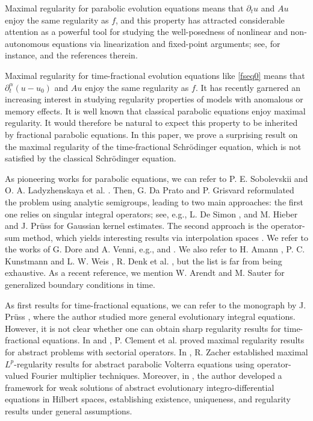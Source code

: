 \documentclass[reqno]{amsart}
\numberwithin{equation}{section}
\begin{document}
Maximal regularity for parabolic evolution equations means that $\partial_t u$ and $Au$ enjoy the same regularity as $f$, and this property has attracted considerable attention as a powerful tool for studying the well-posedness of nonlinear and non-autonomous equations via linearization and fixed-point arguments; see, for instance, \cite{PS16} and the references therein.

Maximal regularity for time-fractional evolution equations like \eqref{fseq0} means that $\partial_t^\alpha (u-u_0)$ and $Au$ enjoy the same regularity as $f$. It has recently garnered an increasing interest in studying regularity properties of models with anomalous or memory effects. It is well known that classical parabolic equations enjoy maximal regularity. It would therefore be natural to expect this property to be inherited by fractional parabolic equations. In this paper, we prove a surprising result on the maximal regularity of the time-fractional Schrödinger equation, which is not satisfied by the classical Schrödinger equation.

As pioneering works for parabolic equations, we can refer to P. E. Sobolevskii \cite{Sob64} and O. A. Ladyzhenskaya et al. \cite{La68}. Then, G. Da Prato and P. Grisvard \cite{DaP75} reformulated the problem using analytic semigroups, leading to two main approaches: the first one relies on singular integral operators; see, e.g., L. De Simon \cite{DeS64}, and M. Hieber and J. Prüss \cite{HP97} for Gaussian kernel estimates. The second approach is the operator-sum method, which yields interesting results via interpolation spaces \cite{DaP75}. We refer to the works of G. Dore and A. Venni, e.g., \cite{DV87} and \cite{Do93}. We also refer to H. Amann \cite{Am95}, P. C. Kunstmann and L. W. Weis \cite{KW04}, R. Denk et al. \cite{DHP03}, but the list is far from being exhaustive. As a recent reference, we mention W. Arendt and M. Sauter \cite{AS26} for generalized boundary conditions in time.

As first results for time-fractional equations, we can refer to the monograph by J. Pr\"uss \cite{Pr93}, where the author studied more general evolutionary integral equations. However, it is not clear whether one can obtain sharp regularity results for time-fractional equations. In \cite{CGL00} and \cite{CGL01}, P. Clement et al. proved maximal regularity results for abstract problems with sectorial operators. In \cite{Za05}, R. Zacher established maximal $L^p$-regularity results for abstract parabolic Volterra equations using operator-valued Fourier multiplier techniques. Moreover, in \cite{Za09}, the author developed a framework for weak solutions of abstract evolutionary integro‑differential equations in Hilbert spaces, establishing existence, uniqueness, and regularity results under general assumptions.
\end{document}
